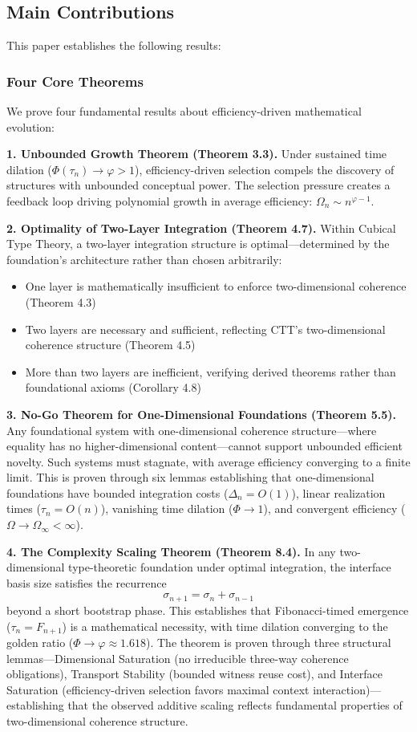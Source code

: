 \documentclass[11pt]{article}
\theoremstyle{definition}
\theoremstyle{remark}
\begin{document}
\subsection{Main Contributions}

This paper establishes the following results:

\subsubsection*{Four Core Theorems}

We prove four fundamental results about efficiency-driven mathematical evolution:

\textbf{1. Unbounded Growth Theorem (Theorem 3.3).} Under sustained time dilation ($\Phi(\tau_n) \to \varphi > 1$), efficiency-driven selection compels the discovery of structures with unbounded conceptual
power. The selection pressure creates a feedback loop driving polynomial growth in average
efficiency: $\Omega_n \sim n^{\varphi-1}$.

\textbf{2. Optimality of Two-Layer Integration (Theorem 4.7).} Within Cubical Type Theory, a two-layer integration structure is optimal---determined by the foundation's architecture rather than
chosen arbitrarily:
\begin{itemize}
\item One layer is mathematically insufficient to enforce two-dimensional coherence (Theorem 4.3)
\item Two layers are necessary and sufficient, reflecting CTT's two-dimensional coherence structure (Theorem 4.5)
\item More than two layers are inefficient, verifying derived theorems rather than foundational
axioms (Corollary 4.8)
\end{itemize}

\textbf{3. No-Go Theorem for One-Dimensional Foundations (Theorem 5.5).} Any foundational
system with one-dimensional coherence structure---where equality has no higher-dimensional
content---cannot support unbounded efficient novelty. Such systems must stagnate, with average
efficiency converging to a finite limit. This is proven through six lemmas establishing that one-dimensional foundations have bounded integration costs ($\Delta_n = O(1)$), linear realization times
($\tau_n = O(n)$), vanishing time dilation ($\Phi \to 1$), and convergent efficiency ($\Omega \to \Omega_\infty < \infty$).

\textbf{4. The Complexity Scaling Theorem (Theorem 8.4).} In any two-dimensional type-theoretic foundation under optimal integration, the interface basis size satisfies the recurrence
\[
\sigma_{n+1} = \sigma_n + \sigma_{n-1}
\]
beyond a short bootstrap phase. This establishes that Fibonacci-timed emergence ($\tau_n = F_{n+1}$)
is a mathematical necessity, with time dilation converging to the golden ratio ($\Phi \to \varphi \approx 1.618$).
The theorem is proven through three structural lemmas---Dimensional Saturation (no irreducible
three-way coherence obligations), Transport Stability (bounded witness reuse cost), and Interface
Saturation (efficiency-driven selection favors maximal context interaction)---establishing that the
observed additive scaling reflects fundamental properties of two-dimensional coherence structure.
\end{document}
